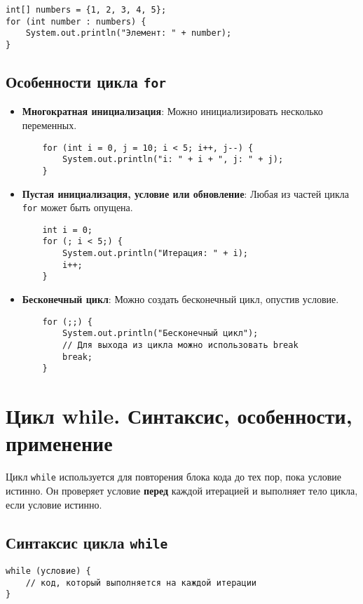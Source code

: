 \documentclass[12pt, a4paper]{article}
\begin{document}
\begin{verbatim}
int[] numbers = {1, 2, 3, 4, 5};
for (int number : numbers) {
    System.out.println("Элемент: " + number);
}
\end{verbatim}

\subsection*{Особенности цикла \texttt{for}}

\begin{itemize}
    \item \textbf{Многократная инициализация}: Можно инициализировать несколько переменных.
    \begin{verbatim}
    for (int i = 0, j = 10; i < 5; i++, j--) {
        System.out.println("i: " + i + ", j: " + j);
    }
    \end{verbatim}

    \item \textbf{Пустая инициализация, условие или обновление}: Любая из частей цикла \texttt{for} может быть опущена.
    \begin{verbatim}
    int i = 0;
    for (; i < 5;) {
        System.out.println("Итерация: " + i);
        i++;
    }
    \end{verbatim}

    \item \textbf{Бесконечный цикл}: Можно создать бесконечный цикл, опустив условие.
    \begin{verbatim}
    for (;;) {
        System.out.println("Бесконечный цикл");
        // Для выхода из цикла можно использовать break
        break;
    }
    \end{verbatim}
\end{itemize}


\section{Цикл while. Синтаксис, особенности, применение}
Цикл \texttt{while} используется для повторения блока кода до тех пор, пока условие истинно. Он проверяет условие \textbf{перед} каждой итерацией и выполняет тело цикла, если условие истинно.

\subsection*{Синтаксис цикла \texttt{while}}

\begin{verbatim}
while (условие) {
    // код, который выполняется на каждой итерации
}
\end{verbatim}
\end{document}
